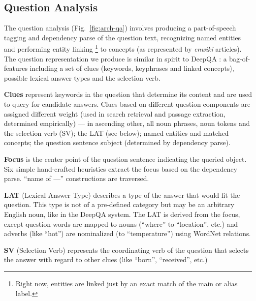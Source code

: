 \subsection{Question Analysis}

The question analysis (Fig.~\ref{fig:arch-qa}) involves
producing a part-of-speech tagging and dependency parse of the question text,
recognizing named entities and
performing entity linking%
\footnote{Right now, entities are linked just by an exact match of the main or alias label.}
to concepts (as represented by \textit{enwiki} articles).
The question representation we produce is similar in spirit
to DeepQA \cite{WatsonQuestion}: a bag-of-features including
a set of clues (keywords, keyphrases and linked concepts),
possible lexical answer types and the selection verb.

\textbf{Clues} represent keywords in the question that determine its content
and are used to query for candidate answers.
Clues based on different question components are assigned different weight
(used in search retrieval and passage extraction, determined empirically) ---
in ascending other, all noun phrases, noun tokens and the selection verb (SV);
the LAT (see below); named entities and matched concepts;
the question sentence subject (determined by dependency parse).

\textbf{Focus} is the center point of the question sentence
indicating the queried object.
Six simple hand-crafted heuristics extract the focus based on the dependency parse.
``name of ---'' constructions are traversed.

\textbf{LAT} (Lexical Answer Type) describes a type of the answer that would fit the question.
This type is not of a pre-defined category but may be an arbitrary English noun,
like in the DeepQA system. \citep{WatsonTyCor}
The LAT is derived from the focus, except question words are mapped to nouns
(``where'' to ``location'', etc.)
and adverbs (like ``hot'') are nominalized (to ``temperature'') using WordNet relations.

\textbf{SV} (Selection Verb) represents the coordinating verb of the
question that selects the answer with regard to other clues (like ``born'',
``received'', etc.)

